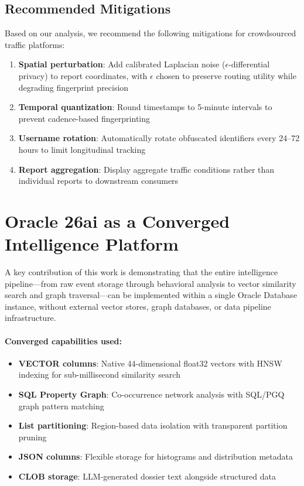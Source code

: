 \documentclass[11pt,a4paper]{article}
\begin{document}
\subsection{Recommended Mitigations}

Based on our analysis, we recommend the following mitigations for crowdsourced traffic platforms:

\begin{enumerate}
    \item \textbf{Spatial perturbation}: Add calibrated Laplacian noise ($\epsilon$-differential privacy) to report coordinates, with $\epsilon$ chosen to preserve routing utility while degrading fingerprint precision
    \item \textbf{Temporal quantization}: Round timestamps to 5-minute intervals to prevent cadence-based fingerprinting
    \item \textbf{Username rotation}: Automatically rotate obfuscated identifiers every 24--72 hours to limit longitudinal tracking
    \item \textbf{Report aggregation}: Display aggregate traffic conditions rather than individual reports to downstream consumers
\end{enumerate}

\section{Oracle 26ai as a Converged Intelligence Platform}
\label{sec:oracle}

A key contribution of this work is demonstrating that the entire intelligence pipeline---from raw event storage through behavioral analysis to vector similarity search and graph traversal---can be implemented within a single Oracle Database instance, without external vector stores, graph databases, or data pipeline infrastructure.

\paragraph{Converged capabilities used:}
\begin{itemize}
    \item \textbf{VECTOR columns}: Native 44-dimensional float32 vectors with HNSW indexing for sub-millisecond similarity search
    \item \textbf{SQL Property Graph}: Co-occurrence network analysis with SQL/PGQ graph pattern matching
    \item \textbf{List partitioning}: Region-based data isolation with transparent partition pruning
    \item \textbf{JSON columns}: Flexible storage for histograms and distribution metadata
    \item \textbf{CLOB storage}: LLM-generated dossier text alongside structured data
\end{itemize}
\end{document}
